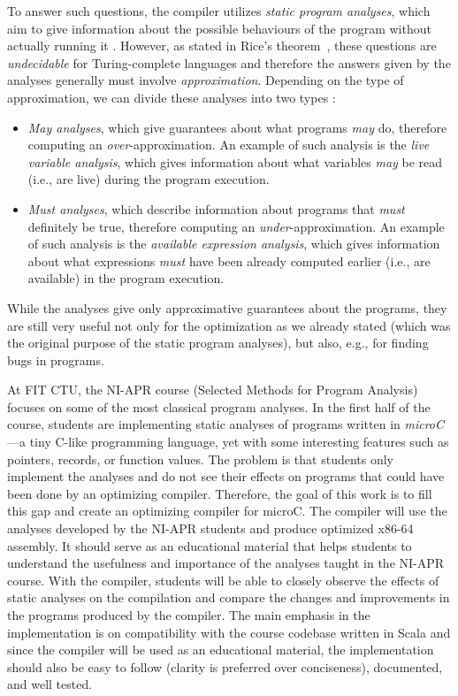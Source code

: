 \documentclass[thesis=M,english]{FITthesis}[2019/12/23]
\begin{document}
To answer such questions, the compiler utilizes \emph{static program analyses}, which aim to give information about the possible behaviours of the program without actually running it \cite[Introduction]{spa}. However, as stated in Rice's theorem~\cite{rice}, these questions are \emph{undecidable} for Turing-complete languages and therefore the answers given by the analyses generally must involve \emph{approximation}. Depending on the type of approximation, we can divide these analyses into two types \cite[Chap. 5.8]{spa}:
\pagebreak
\begin{itemize}
    \item \emph{May analyses}, which give guarantees about what programs \emph{may} do, therefore computing an \emph{over}-approximation. An example of such analysis is the \emph{live variable analysis}, which gives information about what variables \emph{may} be read (i.e., are live) during the program execution.
    \item \emph{Must analyses}, which describe information about programs that \emph{must} definitely be true, therefore computing an \emph{under}-approximation. An example of such analysis is the \emph{available expression analysis}, which gives information about what expressions \emph{must} have been already computed earlier (i.e., are available) in the program execution.
\end{itemize}

While the analyses give only approximative guarantees about the programs, they are still very useful not only for the optimization as we already stated (which was the original purpose of the static program analyses), but also, e.g., for finding bugs in programs.

At FIT CTU, the NI-APR course (Selected Methods for Program Analysis)~\cite{apr} focuses on some of the most classical program analyses. In the first half of the course, students are implementing static analyses of programs written in \emph{microC}---a tiny C-like programming language, yet with some interesting features such as pointers, records, or function values. The problem is that students only implement the analyses and do not see their effects on programs that could have been done by an optimizing compiler. Therefore, the goal of this work is to fill this gap and create an optimizing compiler for microC. The compiler will use the analyses developed by the NI-APR students and produce optimized x86-64 assembly. It should serve as an educational material that helps students to understand the usefulness and importance of the analyses taught in the NI-APR course. With the compiler, students will be able to closely observe the effects of static analyses on the compilation and compare the changes and improvements in the programs produced by the compiler. The main emphasis in the implementation is on compatibility with the course codebase written in Scala and since the compiler will be used as an educational material, the implementation should also be easy to follow (clarity is preferred over conciseness), documented, and well tested.
\end{document}
